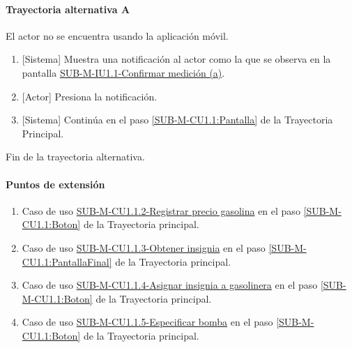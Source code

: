 \paragraph{Trayectoria alternativa A} \label{SUB-M-CU1.1:TA}
	El actor no se encuentra usando la aplicación móvil.
	\begin{enumerate}[label=A\arabic*.]
		\item {[Sistema]} Muestra una notificación al actor como la que se observa en la pantalla \hyperref[fig:sub-m-iu1.1.a]{SUB-M-IU1.1-Confirmar medición (a)}.
		\item {[Actor]} Presiona la notificación.
		\item {[Sistema]} Continúa en el paso \ref{SUB-M-CU1.1:Pantalla} de la Trayectoria Principal.
	\end{enumerate}
	Fin de la trayectoria alternativa.

\paragraph{Puntos de extensión} \label{SUB-M-CU1.1:P}
\begin{enumerate}[label=PE\arabic*.]
	\item Caso de uso \hyperref[SUB-M-CU1.1.3]{SUB-M-CU1.1.2-Registrar precio gasolina} en el paso \ref{SUB-M-CU1.1:Boton} de la Trayectoria principal.
	\item Caso de uso \hyperref[SUB-M-CU1.1.3]{SUB-M-CU1.1.3-Obtener insignia} en el paso \ref{SUB-M-CU1.1:PantallaFinal} de la Trayectoria principal.
	\item Caso de uso \hyperref[SUB-M-CU1.1.4]{SUB-M-CU1.1.4-Asignar insignia a gasolinera} en el paso \ref{SUB-M-CU1.1:Boton} de la Trayectoria principal.
	\item Caso de uso \hyperref[SUB-M-CU1.1.5]{SUB-M-CU1.1.5-Especificar bomba} en el paso \ref{SUB-M-CU1.1:Boton} de la Trayectoria principal.
\end{enumerate}
